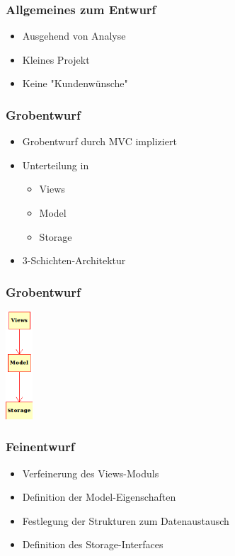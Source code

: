 \begin{frame}
    \frametitle{Allgemeines zum Entwurf}
    \begin{itemize}
        \item Ausgehend von Analyse
        \item Kleines Projekt
        \item Keine "Kundenw\"unsche"
    \end{itemize}
\end{frame}
\begin{frame}
    \frametitle{Grobentwurf}
    \begin{itemize}
        \item Grobentwurf durch MVC impliziert
        \item Unterteilung in
        \begin{itemize}
          \item Views
          \item Model
          \item Storage
        \end{itemize}
        \item 3-Schichten-Architektur
    \end{itemize}
\end{frame}
\begin{frame}
    \frametitle{Grobentwurf}
    \begin{center}
        \includegraphics[width=1cm]{../design/grobentwurf.png}
    \end{center}
\end{frame}
\begin{frame}
    \frametitle{Feinentwurf}
    \begin{itemize}
        \item Verfeinerung des Views-Moduls
        \item Definition der Model-Eigenschaften
        \item Festlegung der Strukturen zum Datenaustausch
        \item Definition des Storage-Interfaces
    \end{itemize}
\end{frame}
